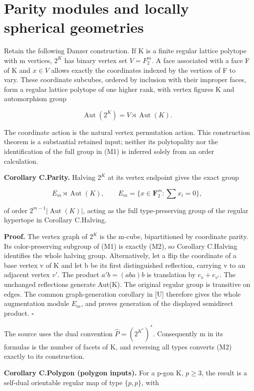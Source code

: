 \section{Parity modules and locally spherical
geometries}\label{parity-modules-and-locally-spherical-geometries}

Retain the following Danzer construction. If K is a finite regular
lattice polytope with m vertices, \(2^K\) has binary vertex set
\(V=F_{2}^m\). A face associated with a face F of K and \(x\in V\)
allows exactly the coordinates indexed by the vertices of F to vary.
These coordinate subcubes, ordered by inclusion with their improper
faces, form a regular lattice polytope of one higher rank, with vertex
figures K and automorphism group

\[
\operatorname{Aut}(2^K)=V\rtimes\operatorname{Aut}(K).
\tag{M1}
\]

The coordinate action is the natural vertex permutation action. This
construction theorem is a substantial retained input; neither its
polytopality nor the identification of the full group in (M1) is
inferred solely from an order calculation.

\textbf{Corollary C.Parity.} Halving \(2^K\) at its vertex endpoint
gives the exact group

\[
E_m\rtimes\operatorname{Aut}(K),\qquad
E_m=\{x\in\mathbf F_2^m:\sum x_i=0\},
\tag{M2}
\]

of order \(2^{m-1}|\operatorname{Aut}(K)|\), acting as the full
type-preserving group of the regular hypertope in Corollary C.Halving.

\textbf{Proof.} The vertex graph of \(2^K\) is the m-cube, bipartitioned
by coordinate parity. Its color-preserving subgroup of (M1) is exactly
(M2), so Corollary C.Halving identifies the whole halving group.
Alternatively, let a flip the coordinate of a base vertex v of K and let
b be its first distinguished reflection, carrying v to an adjacent
vertex \(v'\). The product \(a'b=(aba)b\) is translation by
\(e_v+e_{v'}\). The unchanged reflections generate Aut(K). The original regular group is transitive on edges. The common graph-generation corollary in [U] therefore gives the whole augmentation module \(E_m\), and proves generation of the displayed semidirect product. \(\square\)

The source uses the dual convention \(\widehat P=(2^{K^*})^*\). Consequently m
in its formulas is the number of facets of K, and reversing all types
converts (M2) exactly to its construction.

\textbf{Corollary C.Polygon (polygon inputs).} For a p-gon K,
\(p\ge 3\), the result is a self-dual orientable regular map of type
\(\{p,p\}\), with


